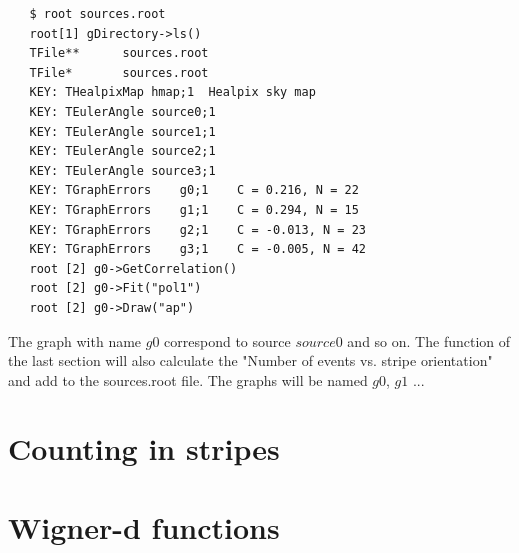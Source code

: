 \documentclass[12pt]{article}
\begin{document}
{ \color{brown}
   \begin{lstlisting}
   $ root sources.root
   root[1] gDirectory->ls()
   TFile**		sources.root	
   TFile*		sources.root	
   KEY: THealpixMap	hmap;1	Healpix sky map
   KEY: TEulerAngle	source0;1	
   KEY: TEulerAngle	source1;1	
   KEY: TEulerAngle	source2;1	
   KEY: TEulerAngle	source3;1	
   KEY: TGraphErrors	g0;1	C = 0.216, N = 22
   KEY: TGraphErrors	g1;1	C = 0.294, N = 15
   KEY: TGraphErrors	g2;1	C = -0.013, N = 23
   KEY: TGraphErrors	g3;1	C = -0.005, N = 42
   root [2] g0->GetCorrelation()
   root [2] g0->Fit("pol1")
   root [2] g0->Draw("ap")
   \end{lstlisting}
}

The graph with name $g0$ correspond to source $source0$ and so on.
The function of the last section will also calculate the "Number of events vs. stripe orientation"
and add to the sources.root file. The graphs will be named $g0$, $g1$ ...

\section{Counting in stripes} \label{ch::raios-cosmicos}


\section{Wigner-d functions}
\appendix
\end{document}

